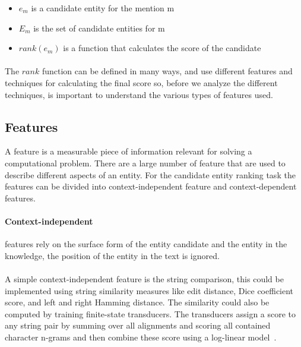 \begin{itemize}[noitemsep,  topsep=10pt]
\item $e_m$ is a candidate entity for the mention m
\item $E_m$ is the set of candidate entities for m
\item $rank(e_m)$ is a function that calculates the score of the candidate
\end{itemize}

\paragraph{}
The $rank$ function can be defined in many ways, and use different features and techniques for calculating the final score so, before we analyze the different techniques, is important to understand the various types of features used.

\subsection{Features}
A feature is a measurable piece of information relevant for solving a computational problem. There are a large number of feature that are used to describe different aspects of an entity. For the candidate entity ranking task the features can be divided into context-independent feature and context-dependent features.

\paragraph{Context-independent} features rely on the surface form of the entity candidate and the entity in the knowledge, the position of the entity in the text is ignored. 

\paragraph{} A simple context-independent feature is the string comparison, this could be implemented using string similarity measures like edit distance, Dice coefficient score, and left and right Hamming distance. The similarity could also be computed by training finite-state transducers. The transducers assign a score to any string pair by summing over all alignments and scoring all contained character n-grams and then combine these score using a log-linear model~\cite{dredze2010entity}.

